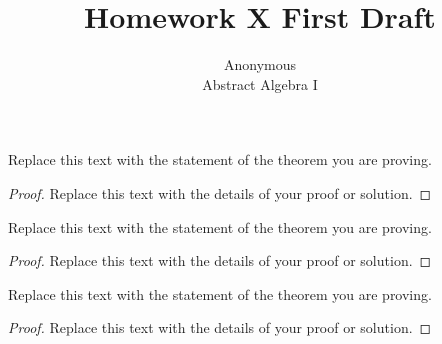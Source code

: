 \documentclass{article}
\newenvironment{theorem}[2][Theorem]{\begin{trivlist}
\item[\hskip \labelsep {\bfseries #1}\hskip \labelsep {\bfseries #2.}]}{\end{trivlist}}
\begin{document}

\title{Homework X First Draft} %
\author{Anonymous\\Abstract Algebra I} %

\maketitle

%
%

\begin{theorem}{x.yz}
Replace this text with the statement of the theorem you are proving.
\end{theorem}

\begin{proof}
Replace this text with the details of your proof or solution.
\end{proof}


\vspace{0.25in} %

\begin{theorem}{x.yz}
Replace this text with the statement of the theorem you are proving.
\end{theorem}

\begin{proof}
Replace this text with the details of your proof or solution.
\end{proof}


\vspace{0.25in} %

\begin{theorem}{x.yz}
Replace this text with the statement of the theorem you are proving.
\end{theorem}

\begin{proof}
Replace this text with the details of your proof or solution.
\end{proof}

\end{document}
